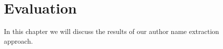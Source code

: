 \chapter{Evaluation}\label{cha:evaluation}

In this chapter we will discuss the results of our author name extraction approach.


